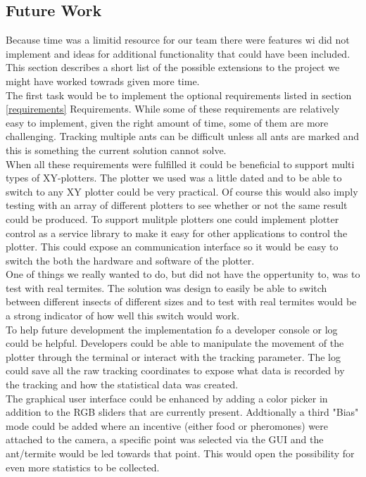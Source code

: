 
\subsection{Future Work}

Because time was a limitid resource for our team there were features wi did not implement and ideas for additional functionality that could have been included. This section describes a short list of the possible extensions to the project we might have worked towrads given more time. \\

The first task would be to implement the optional requirements listed in section \ref{requirements} Requirements. While some of these requirements are relatively easy to implement, given the right amount of time, some of them are more challenging. Tracking multiple ants can be difficult unless all ants are marked and this is something the current solution cannot solve. \\

When all these requirements were fulfilled it could be beneficial to support multi types of XY-plotters. The plotter we used was a little dated and to be able to switch to any XY plotter could be very practical. Of course this would also imply testing with an array of different plotters to see whether or not the same result could be produced. To support mulitple plotters one could implement plotter control as a service library to make it easy for other applications to control the plotter. This could expose an communication interface so it would be easy to switch the both the hardware and software of the plotter. \\

One of things we really wanted to do, but did not have the oppertunity to, was to test with real termites. The solution was design to easily be able to switch between different insects of different sizes and to test with real termites would be a strong indicator of how well this switch would work. \\

To help future development the implementation fo a developer console or log could be helpful. Developers could be able to manipulate the movement of the plotter through the terminal or interact with the tracking parameter. The log could save all the raw tracking coordinates to expose what data is recorded by the tracking and how the statistical data was created. \\

The graphical user interface could be enhanced by adding a color picker in addition to the RGB sliders that are currently present. Addtionally a third "Bias" mode could be added where an incentive (either food or pheromones) were attached to the camera, a specific point was selected via the GUI and the ant/termite would be led towards that point. This would open the possibility for even more statistics to be collected.